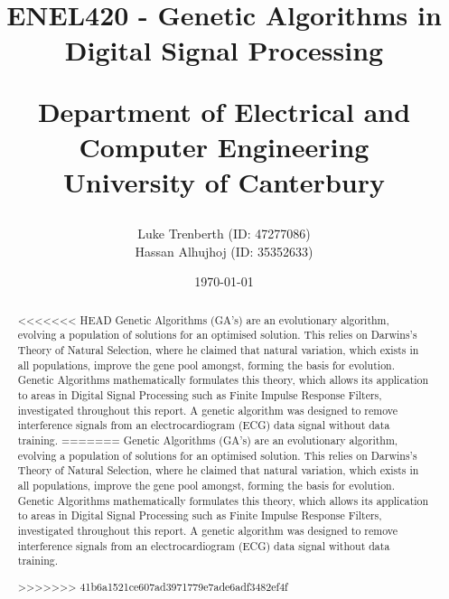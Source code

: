 \documentclass[a4paper, 11pt]{article}
\title{
    ENEL420 - Genetic Algorithms in Digital Signal Processing\\
    \vspace{2cm}
    \begin{large} 
        Department of Electrical and Computer Engineering\\
        University of Canterbury\\
    \end{large}
    \vspace{2cm}
}
\author{
    \small {Luke Trenberth (ID: 47277086)}\\
    \small {Hassan Alhujhoj (ID: 35352633)}\\
    }
\date{\small\today}
\begin{document}
\maketitle

\vspace{2cm}
\begin{abstract}
<<<<<<< HEAD
    \textrm {
        Genetic Algorithms (GA's) are an evolutionary algorithm, evolving a population of solutions for an optimised 
        solution. This relies on Darwins's Theory of Natural Selection, where he claimed that natural variation, which exists in
        all populations, improve the gene pool amongst, forming the basis for evolution. Genetic Algorithms mathematically 
        formulates this theory, which allows its application to areas in Digital Signal Processing such as 
        Finite Impulse Response Filters, investigated throughout this report. A genetic algorithm was designed to remove
        interference signals from an electrocardiogram (ECG) data signal without data training.
    }
=======
    Genetic Algorithms (GA's) are an evolutionary algorithm, evolving a population of solutions for an optimised 
    solution. This relies on Darwins's Theory of Natural Selection, where he claimed that natural variation, which exists in
    all populations, improve the gene pool amongst, forming the basis for evolution. Genetic Algorithms mathematically 
    formulates this theory, which allows its application to areas in Digital Signal Processing such as 
    Finite Impulse Response Filters, investigated throughout this report. A genetic algorithm was designed to remove
    interference signals from an electrocardiogram (ECG) data signal without data training. 
    
>>>>>>> 41b6a1521ce607ad3971779e7ade6adf3482ef4f
\end{abstract}

\pagebreak
{}
\tableofcontents
{}
\pagebreak
\end{document}
